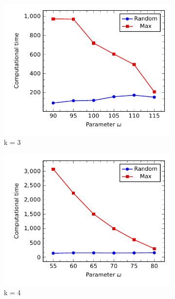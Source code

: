 %
\begin{figure}[h]
	\begin{subfigure}[t]{.5\textwidth}
		\centering
		\includegraphics[scale=.8]{Hinhanh/OmegaEffect/time/k3.pdf}		
		\caption{k = 3}
	\end{subfigure}
	\begin{subfigure}[t]{.5\textwidth}
		\centering
		\includegraphics[scale=.8]{Hinhanh/OmegaEffect/time/k4.pdf}		
		\caption{k = 4}
	\end{subfigure}
\caption{}
\label{fig:}
\end{figure}
%
